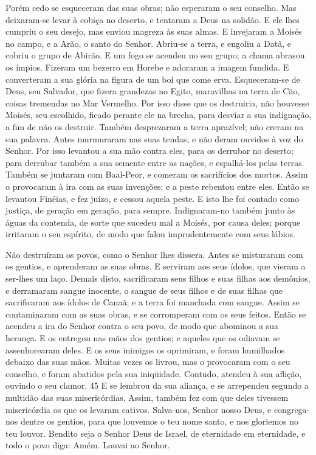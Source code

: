 Porém cedo se esqueceram das suas obras; não esperaram o seu
conselho. Mas deixaram-se levar à cobiça no deserto, e
tentaram a Deus na solidão. E ele lhes cumpriu o seu desejo,
mas enviou magreza às suas almas. E invejaram a Moisés no
campo, e a Arão, o santo do Senhor. Abriu-se a terra, e
engoliu a Datã, e cobriu o grupo de Abirão. E um fogo se
acendeu no seu grupo; a chama abrasou os ímpios. Fizeram um
bezerro em Horebe e adoraram a imagem fundida. E converteram
a sua glória na figura de um boi que come erva. Esqueceram-se
de Deus, seu Salvador, que fizera grandezas no Egito,
maravilhas na terra de Cão, coisas tremendas no Mar Vermelho.
Por isso disse que os destruiria, não houvesse Moisés, seu
escolhido, ficado perante ele na brecha, para desviar a sua
indignação, a fim de não os destruir. Também desprezaram a
terra aprazível; não creram na sua palavra. Antes murmuraram
nas suas tendas, e não deram ouvidos à voz do Senhor. Por
isso levantou a sua mão contra eles, para os derrubar no deserto;
para derrubar também a sua semente entre as nações, e
espalhá-los pelas terras. Também se juntaram com Baal-Peor, e
comeram os sacrifícios dos mortos. Assim o provocaram à ira
com as suas invenções; e a peste rebentou entre eles. Então
se levantou Finéias, e fez juízo, e cessou aquela peste. E
isto lhe foi contado como justiça, de geração em geração, para
sempre. Indignaram-no também junto às águas da contenda, de
sorte que sucedeu mal a Moisés, por causa deles; porque
irritaram o seu espírito, de modo que falou imprudentemente com seus
lábios.

Não destruíram os povos, como o Senhor lhes dissera. Antes
se misturaram com os gentios, e aprenderam as suas obras. E
serviram aos seus ídolos, que vieram a ser-lhes um laço.
Demais disto, sacrificaram seus filhos e suas filhas aos
demônios, e derramaram sangue inocente, o sangue de seus
filhos e de suas filhas que sacrificaram aos ídolos de Canaã; e a
terra foi manchada com sangue. Assim se contaminaram com as
suas obras, e se corromperam com os seus feitos. Então se
acendeu a ira do Senhor contra o seu povo, de modo que abominou a
sua herança. E os entregou nas mãos dos gentios; e aqueles
que os odiavam se assenhorearam deles. E os seus inimigos os
oprimiram, e foram humilhados debaixo das suas mãos. Muitas
vezes os livrou, mas o provocaram com o seu conselho, e foram
abatidos pela sua iniqüidade. Contudo, atendeu à sua aflição,
ouvindo o seu clamor. 45 E se lembrou da sua aliança, e se
arrependeu segundo a multidão das suas misericórdias. Assim,
também fez com que deles tivessem misericórdia os que os levaram
cativos. Salva-nos, Senhor nosso Deus, e congrega-nos dentre
os gentios, para que louvemos o teu nome santo, e nos gloriemos no
teu louvor. Bendito seja o Senhor Deus de Israel, de
eternidade em eternidade, e todo o povo diga: Amém. Louvai ao
Senhor.

